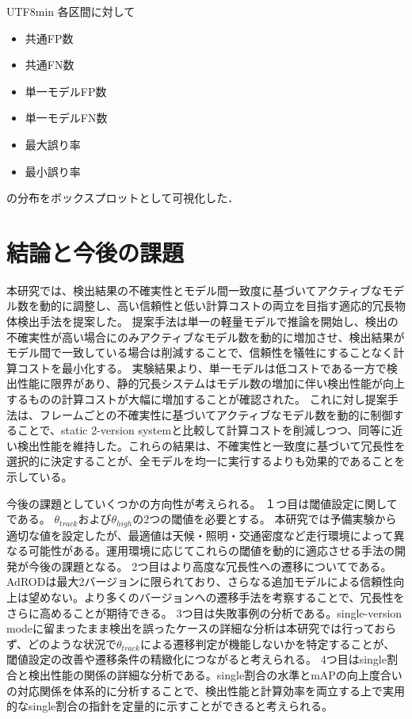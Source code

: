 \documentclass[conference, dvipdfmx]{IEEEtran}
\begin{document}
\begin{CJK}{UTF8}{min}
各区間に対して

\begin{itemize}
 \item 共通FP数
 \item 共通FN数
 \item 単一モデルFP数
 \item 単一モデルFN数
 \item 最大誤り率
 \item 最小誤り率
\end{itemize}

の分布をボックスプロットとして可視化した．
\section{結論と今後の課題}
\label{sec: conclusion}
本研究では、検出結果の不確実性とモデル間一致度に基づいてアクティブなモデル数を動的に調整し、高い信頼性と低い計算コストの両立を目指す適応的冗長物体検出手法を提案した。
提案手法は単一の軽量モデルで推論を開始し、検出の不確実性が高い場合にのみアクティブなモデル数を動的に増加させ、検出結果がモデル間で一致している場合は削減することで、信頼性を犠牲にすることなく計算コストを最小化する。
実験結果より、単一モデルは低コストである一方で検出性能に限界があり、静的冗長システムはモデル数の増加に伴い検出性能が向上するものの計算コストが大幅に増加することが確認された。
これに対し提案手法は、フレームごとの不確実性に基づいてアクティブなモデル数を動的に制御することで、static 2-version systemと比較して計算コストを削減しつつ、同等に近い検出性能を維持した。これらの結果は、不確実性と一致度に基づいて冗長性を選択的に決定することが、全モデルを均一に実行するよりも効果的であることを示している。

今後の課題としていくつかの方向性が考えられる。
１つ目は閾値設定に関してである。
$\theta_{track}$および$\theta_{high}$の2つの閾値を必要とする。
本研究では予備実験から適切な値を設定したが、最適値は天候・照明・交通密度など走行環境によって異なる可能性がある。運用環境に応じてこれらの閾値を動的に適応させる手法の開発が今後の課題となる。
2つ目はより高度な冗長性への遷移についてである。AdRODは最大2バージョンに限られており、さらなる追加モデルによる信頼性向上は望めない。より多くのバージョンへの遷移手法を考察することで、冗長性をさらに高めることが期待できる。
3つ目は失敗事例の分析である。single-version modeに留まったまま検出を誤ったケースの詳細な分析は本研究では行っておらず、どのような状況で$\theta_{track}$による遷移判定が機能しないかを特定することが、閾値設定の改善や遷移条件の精緻化につながると考えられる。
4つ目はsingle割合と検出性能の関係の詳細な分析である。single割合の水準とmAPの向上度合いの対応関係を体系的に分析することで、検出性能と計算効率を両立する上で実用的なsingle割合の指針を定量的に示すことができると考えられる。


\end{CJK}
\end{document}
